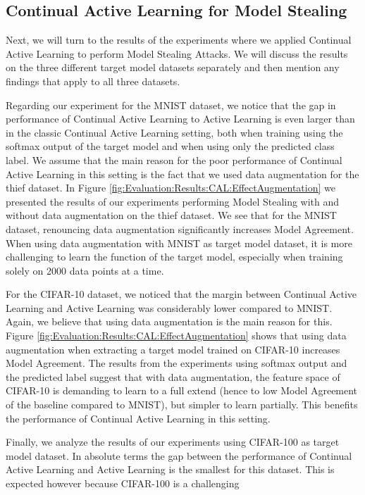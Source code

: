 \subsection{Continual Active Learning for Model Stealing}
\label{sec:Discussion:ModelStealing:CALMS}
Next, we will turn to the results of the experiments where we applied Continual Active Learning to perform Model Stealing Attacks. We will discuss the results on the three different target model datasets separately and then mention any findings that apply to all three datasets. \par
Regarding our experiment for the MNIST dataset, we notice that the gap in performance of Continual Active Learning to Active Learning is even larger than in the classic Continual Active Learning setting, both when training using the softmax output of the target model and when using 
only the predicted class label. We assume that the main reason for the poor performance of Continual Active Learning in this setting is the fact that we used data augmentation for the thief dataset. In Figure \ref{fig:Evaluation:Results:CAL:EffectAugmentation} we presented the results
of our experiments performing Model Stealing with and without data augmentation on the thief dataset. We see that for the MNIST dataset, renouncing data augmentation significantly increases Model Agreement. When using data augmentation with MNIST as target model dataset, it is more
challenging to learn the function of the target model, especially when training solely on 2000 data points at a time. \par
For the CIFAR-10 dataset, we noticed that the margin between Continual Active Learning and Active Learning was considerably lower compared to MNIST. Again, we believe that using data augmentation is the main reason for this. Figure \ref{fig:Evaluation:Results:CAL:EffectAugmentation}
shows that using data augmentation when extracting a target model trained on CIFAR-10 increases Model Agreement. The results from the experiments using softmax output and the predicted label suggest that with data augmentation, the feature space of CIFAR-10 is demanding to learn to a
full extend (hence to low Model Agreement of the baseline compared to MNIST), but simpler to learn partially. This benefits the performance of Continual Active Learning in this setting. \par
Finally, we analyze the results of our experiments using CIFAR-100 as target model dataset. In absolute terms the gap between the performance of Continual Active Learning and Active Learning is the smallest for this dataset. This is expected however because CIFAR-100 is a challenging
